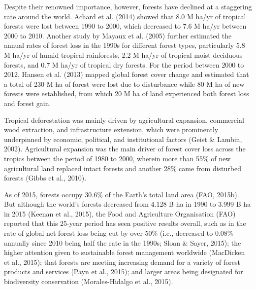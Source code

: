Despite their renowned importance, however, forests have declined at a staggering rate around the world. Achard et al. (2014) showed that 8.0 M ha/yr of tropical forests were lost between 1990 to 2000, which decreased to 7.6 M ha/yr between 2000 to 2010. Another study by Mayaux et al. (2005) further estimated the annual rates of forest loss in the 1990s for different forest types, particularly 5.8 M ha/yr of humid tropical rainforests, 2.2 M ha/yr of tropical moist deciduous forests, and 0.7 M ha/yr of tropical dry forests. For the period between 2000 to 2012, Hansen et al. (2013) mapped global forest cover change and estimated that a total of 230 M ha of forest were lost due to disturbance while 80 M ha of new forests were established, from which 20 M ha of land experienced both forest loss and forest gain.

Tropical deforestation was mainly driven by agricultural expansion, commercial wood extraction, and infrastructure extension, which were prominently underpinned by economic, political, and institutional factors (Geist \& Lambin, 2002). Agricultural expansion was the main driver of forest cover loss across the tropics between the period of 1980 to 2000, wherein more than 55\% of new agricultural land replaced intact forests and another 28\% came from disturbed forests (Gibbs et al., 2010).

As of 2015, forests occupy 30.6\% of the Earth’s total land area (FAO, 2015b). But although the world's forests decreased from 4.128 B ha in 1990 to 3.999 B ha in 2015 (Keenan et al., 2015), the Food and Agriculture Organisation (FAO) reported that this 25-year period has seen positive results overall, such as in the rate of global net forest loss being cut by over 50\% (i.e., decreased to 0.08\% annually since 2010 being half the rate in the 1990s; Sloan \& Sayer, 2015); the higher attention given to sustainable forest management worldwide (MacDicken et al., 2015); that forests are meeting increasing demand for a variety of forest products and services (Payn et al., 2015); and larger areas being designated for biodiversity conservation (Morales-Hidalgo et al., 2015).

